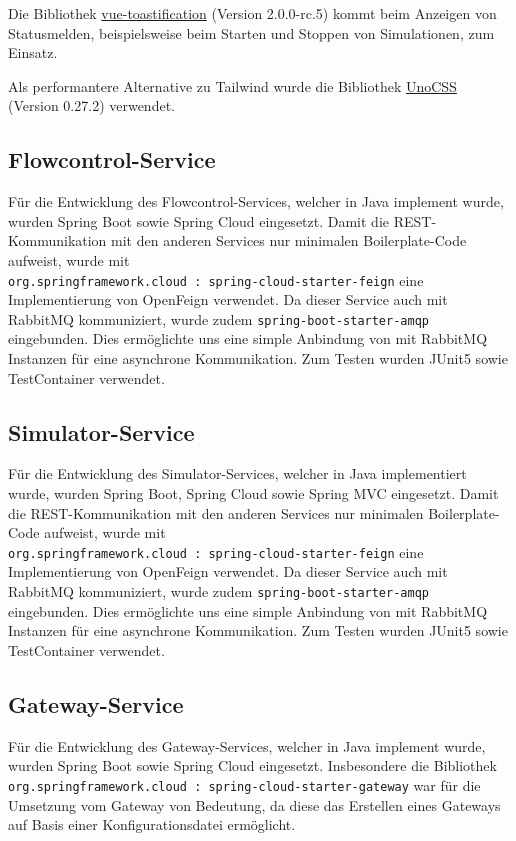 Die Bibliothek \href{https://github.com/Maronato/vue-toastification}{vue-toastification} (Version 2.0.0-rc.5) kommt beim Anzeigen von Statusmelden, beispielsweise beim Starten und Stoppen von Simulationen, zum Einsatz.

Als performantere Alternative zu Tailwind wurde die Bibliothek \href{https://uno.antfu.me}{UnoCSS} (Version 0.27.2) verwendet.

\subsection{Flowcontrol-Service}

Für die Entwicklung des Flowcontrol-Services, welcher in Java implement wurde, wurden Spring Boot sowie Spring Cloud eingesetzt.
Damit die REST-Kommunikation mit den anderen Services nur minimalen Boilerplate-Code aufweist, wurde mit \\ \verb|org.springframework.cloud : spring-cloud-starter-feign| eine Implementierung von OpenFeign verwendet.
Da dieser Service auch mit RabbitMQ kommuniziert, wurde zudem \verb|spring-boot-starter-amqp| eingebunden.
Dies ermöglichte uns eine simple Anbindung von mit RabbitMQ Instanzen für eine asynchrone Kommunikation.
Zum Testen wurden JUnit5 sowie TestContainer verwendet.

\subsection{Simulator-Service}

Für die Entwicklung des Simulator-Services, welcher in Java implementiert wurde, wurden Spring Boot, Spring Cloud sowie Spring MVC eingesetzt.
Damit die REST-Kommunikation mit den anderen Services nur minimalen Boilerplate-Code aufweist, wurde mit \\ \verb|org.springframework.cloud : spring-cloud-starter-feign| eine Implementierung von OpenFeign verwendet.
Da dieser Service auch mit RabbitMQ kommuniziert, wurde zudem \verb|spring-boot-starter-amqp| eingebunden.
Dies ermöglichte uns eine simple Anbindung von mit RabbitMQ Instanzen für eine asynchrone Kommunikation.
Zum Testen wurden JUnit5 sowie TestContainer verwendet.

\subsection{Gateway-Service}

Für die Entwicklung des Gateway-Services, welcher in Java implement wurde, wurden Spring Boot sowie Spring Cloud eingesetzt.
Insbesondere die Bibliothek \verb|org.springframework.cloud : spring-cloud-starter-gateway| war für die Umsetzung vom Gateway von Bedeutung, da diese das Erstellen eines Gateways auf Basis einer Konfigurationsdatei ermöglicht.
